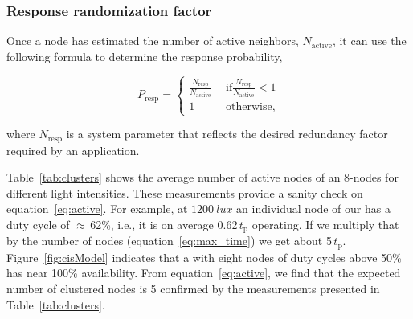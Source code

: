 \subsubsection{Response randomization factor}

Once a node has estimated the number of active neighbors, $N_\text{active}$, it can use the following formula to determine the response probability,  

\begin{equation}
	P_\text{resp} = 
	\begin{cases}
		\frac{N_\text{resp}}{N_\text{active}} & \ \  \text{if} \frac{N_\text{resp}}{N_\text{active}} < 1\\
		1 									  & \ \ \text{otherwise},
	\end{cases}
	\label{eq:randFactor}
\end{equation}

where $N_\text{resp}$ is a system parameter that reflects the desired redundancy factor required by an application. 


Table~\ref{tab:clusters} shows the average number of active nodes of an 8-nodes \cis for different light intensities. These measurements provide a sanity check on equation~\ref{eq:active}. For example, at $\SI{1200}{lux}$ an individual node of our \cis has a duty cycle of $\approx$\,62\%, i.e., it is on average 0.62\,$t_\text{p}$ operating. If we multiply that by the number of nodes (equation~\ref{eq:max_time}) we get about 5\,$t_\text{p}$. Figure~\ref{fig:cisModel} indicates that a \cis with eight nodes of duty cycles above 50\% has near 100\% availability. From equation~\ref{eq:active}, we find that the expected number of clustered nodes is 5 confirmed by the measurements presented in Table~\ref{tab:clusters}. 


